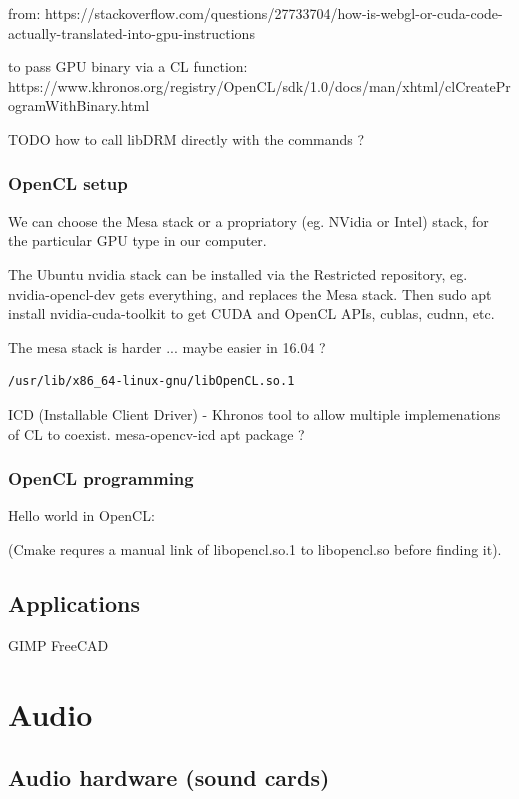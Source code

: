 \documentclass[oneside,english]{scrbook}
\begin{document}
from:
https://stackoverflow.com/questions/27733704/how-is-webgl-or-cuda-code-actually-translated-into-gpu-instructions

to pass GPU binary via a CL function:
https://www.khronos.org/registry/OpenCL/sdk/1.0/docs/man/xhtml/clCreateProgramWithBinary.html


TODO how to call libDRM directly with the commands ?
\section{OpenCL setup}
We can choose the Mesa stack or a propriatory (eg. NVidia or Intel) stack, for the particular GPU type in our computer.

The Ubuntu nvidia stack can be installed via the Restricted repository, eg. nvidia-opencl-dev gets everything, and replaces the Mesa stack.  Then sudo apt install nvidia-cuda-toolkit to get CUDA and OpenCL APIs, cublas, cudnn, etc.

The mesa stack is harder ...  maybe easier in 16.04 ?
\begin{lstlisting}
/usr/lib/x86_64-linux-gnu/libOpenCL.so.1
\end{lstlisting}
ICD (Installable Client Driver) - Khronos tool to allow multiple implemenations of CL to coexist.
mesa-opencv-icd  apt package ?


\section{OpenCL programming}

Hello world in OpenCL:



(Cmake requres a manual link of libopencl.so.1 to libopencl.so before finding it).




\chapter{Applications}

GIMP
FreeCAD




\part{Audio}


\chapter{Audio hardware (sound cards)}
\end{document}
